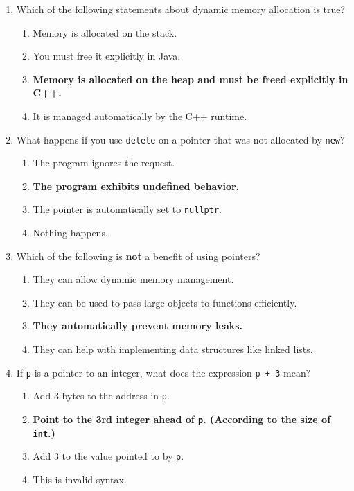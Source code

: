 \documentclass[a4paper,12pt]{article}
\begin{document}
\begin{enumerate}
    \item Which of the following statements about dynamic memory allocation is true?
    \begin{enumerate}
        \item Memory is allocated on the stack.
        \item You must free it explicitly in Java.
        \item \textbf{Memory is allocated on the heap and must be freed explicitly in C++.}
        \item It is managed automatically by the C++ runtime.
    \end{enumerate}

    \item What happens if you use \texttt{delete} on a pointer that was not allocated by \texttt{new}?
    \begin{enumerate}
        \item The program ignores the request.
        \item \textbf{The program exhibits undefined behavior.}
        \item The pointer is automatically set to \texttt{nullptr}.
        \item Nothing happens.
    \end{enumerate}

    \item Which of the following is \textbf{not} a benefit of using pointers?
    \begin{enumerate}
        \item They can allow dynamic memory management.
        \item They can be used to pass large objects to functions efficiently.
        \item \textbf{They automatically prevent memory leaks.}
        \item They can help with implementing data structures like linked lists.
    \end{enumerate}

    \item If \texttt{p} is a pointer to an integer, what does the expression \texttt{p + 3} mean?
    \begin{enumerate}
        \item Add 3 bytes to the address in \texttt{p}.
        \item \textbf{Point to the 3rd integer ahead of \texttt{p}. (According to the size of \texttt{int}.)}
        \item Add 3 to the value pointed to by \texttt{p}.
        \item This is invalid syntax.
    \end{enumerate}


\end{enumerate}
\end{document}
